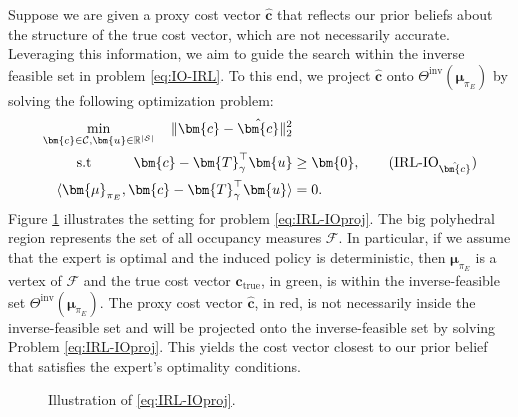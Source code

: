 \documentclass[10pt]{article} %
\def\C{\ensuremath{\mathcal{C}}}
\def\F{\ensuremath{\mathcal{F}}}
\def\mTg{{\bm{T}}_\gamma}
\def\vzero{{\bm{0}}}
\def\vc{{\bm{c}}}
\def\vu{{\bm{u}}}
\def\vmu{{\bm{\mu}}}
\newcommand{\R}{\mathbb{R}}
\newcommand{\St}{\mathcal{S}}
\begin{document}
Suppose we are given a proxy cost vector $\hat{\vc}$ that reflects our prior beliefs about the structure of the true cost vector, which are not necessarily accurate. Leveraging this information, we aim to guide the search within the inverse feasible set in problem \eqref{eq:IO-IRL}. To this end, we project $\hat{\vc}$ onto $\Theta^{\text{inv}}(\vmu_{\pi_E})$ by solving the following optimization problem:
\begin{align}
    \min\limits_{\vc\in \C, \vu \in \R^{|\St|} } \quad \Vert \vc - \hat{\vc}\Vert^2_2& \nonumber
     \\
    \text{s.t} \quad \quad \quad  \vc - \mTg^\top \vu &\geq \vzero,\tag{$\text{IRL-IO}_{\hat{\vc}}$} \label{eq:IRL-IOproj}\\
    \langle\vmu_{\pi_E}, \vc - \mTg^\top \vu  \rangle &= 0 \nonumber .
\end{align}
Figure \ref{fig:illustration_projection} illustrates the setting for problem \eqref{eq:IRL-IOproj}. The big polyhedral region represents the set of all occupancy measures $\F$. In particular, if we assume that the expert is optimal and the induced policy is deterministic, then $\vmu_{\pi_E}$ is a vertex of $\F$ and the true cost vector $\vc_{\text{true}}$, in green, is within the inverse-feasible set $\Theta^{\text{inv}}(\vmu_{\pi_E})$. The proxy cost vector $\hat{\vc}$, in red, is not necessarily inside the inverse-feasible set and will be projected onto the inverse-feasible set by solving Problem \eqref{eq:IRL-IOproj}. This yields the cost vector closest to our prior belief that satisfies the expert's optimality conditions.
\begin{figure}[ht]
    \centering
    \caption{Illustration of \eqref{eq:IRL-IOproj}.}
    \label{fig:illustration_projection}
\end{figure}
\end{document}
